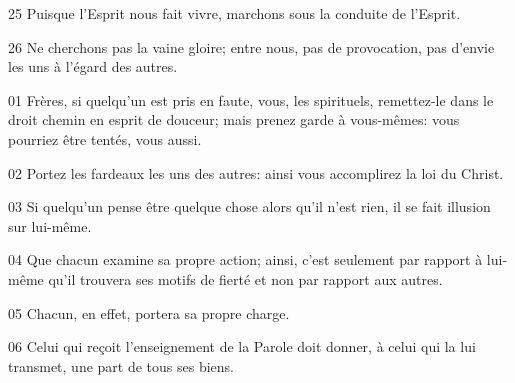 25 Puisque l’Esprit nous fait vivre, marchons sous la conduite de l’Esprit.

26 Ne cherchons pas la vaine gloire; entre nous, pas de provocation, pas d’envie les uns à l’égard des autres.

01 Frères, si quelqu’un est pris en faute, vous, les spirituels, remettez-le dans le droit chemin en esprit de douceur; mais prenez garde à vous-mêmes: vous pourriez être tentés, vous aussi.

02 Portez les fardeaux les uns des autres: ainsi vous accomplirez la loi du Christ.

03 Si quelqu’un pense être quelque chose alors qu’il n’est rien, il se fait illusion sur lui-même.

04 Que chacun examine sa propre action; ainsi, c’est seulement par rapport à lui-même qu’il trouvera ses motifs de fierté et non par rapport aux autres.

05 Chacun, en effet, portera sa propre charge.

06 Celui qui reçoit l’enseignement de la Parole doit donner, à celui qui la lui transmet, une part de tous ses biens.